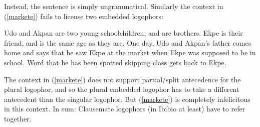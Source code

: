 \documentclass[output=paper]{langscibook}
\begin{document}
Instead, the sentence is simply ungrammatical. Similarly the context in (\ref{markete}) fails to license two embedded logophors:
\begin{context}
	Udo and Akpan are two young schoolchildren, and are brothers. Ekpe is their friend, and is the same age as they are. One day, Udo and Akpan's father comes home and says that he saw Ekpe at the market when Ekpe was supposed to be in school. Word that he has been spotted skipping class gets back to Ekpe.
	\end{context}
	\begin{exe}	
		\label{markete}	
\end{exe}
The context in (\ref{markete}) does not support partial/split antecedence for the plural logophor, and so the plural embedded logophor has to take a different antecedent than the singular logophor. But (\ref{markete}) is completely infelicitous in this context. In sum: Clausemate logophors (in Ibibio at least) have to refer together.
\end{document}

